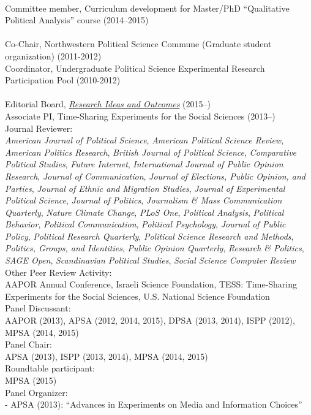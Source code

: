 \documentclass[12pt]{article}
\renewcommand{\section}[1]{\pagebreak[3]%
    \llap{\scshape\smash{\parbox[t]{\marginparwidth}{\raggedright {\color{lg}#1}}}}%
    \vspace{-\baselineskip}\par}
\newcommand{\topic}[1]{\pagebreak[3]\indent {\color{lg}{\footnotesize #1 }}\\}
\newcommand{\entry}[1]{\indent {\color{lg}\guillemotright}\hspace{2pt}#1\vspace{.25em}\\}
\newcommand{\subentry}[1]{{\color{lg}-} #1\vspace{.25em}\\}
\begin{document}
\section{Service}
\topic{Departmental (Aarhus University)}
\entry{Committee member, Curriculum development for Master/PhD ``Qualitative Political Analysis'' course (2014--2015)}

\topic{Departmental (Northwestern University)}
\entry{Co-Chair, Northwestern Political Science Commune (Graduate student organization) (2011-2012)}
\entry{Coordinator, Undergraduate Political Science Experimental Research Participation Pool (2010-2012)}

\topic{Disciplinary}
\entry{Editorial Board, \href{http://riojournal.com/}{{\em Research Ideas and Outcomes}} (2015--)}
\entry{Associate PI, Time-Sharing Experiments for the Social Sciences (2013--)}
\entry{Journal Reviewer:\\{\em American Journal of Political Science}, {\em American Political Science Review}, {\em American Politics Research}, {\em British Journal of Political Science}, {\em Comparative Political Studies}, {\em Future Internet}, {\em International Journal of Public Opinion Research}, {\em Journal of Communication}, {\em Journal of Elections, Public Opinion, and Parties}, {\em Journal of Ethnic and Migration Studies}, {\em Journal of Experimental Political Science}, {\em Journal of Politics}, {\em Journalism \& Mass Communication Quarterly}, {\em Nature Climate Change}, {\em PLoS One}, {\em Political Analysis}, {\em Political Behavior}, {\em Political Communication}, {\em Political Psychology}, {\em Journal of Public Policy}, {\em Political Research Quarterly}, {\em Political Science Research and Methods}, {\em Politics, Groups, and Identities}, {\em Public Opinion Quarterly}, {\em Research \& Politics}, {\em SAGE Open}, {\em Scandinavian Political Studies}, {\em Social Science Computer Review}}
\entry{Other Peer Review Activity:\\ AAPOR Annual Conference, Israeli Science Foundation, TESS: Time-Sharing Experiments for the Social Sciences, U.S. National Science Foundation}
\entry{Panel Discussant:\\ AAPOR (2013), APSA (2012, 2014, 2015), DPSA (2013, 2014), ISPP (2012), MPSA (2014, 2015)}
\entry{Panel Chair:\\ APSA (2013), ISPP (2013, 2014), MPSA (2014, 2015)}
\entry{Roundtable participant:\\ MPSA (2015)}
\entry{Panel Organizer:}
\subentry{APSA (2013): ``Advances in Experiments on Media and Information Choices''}
\end{document}
